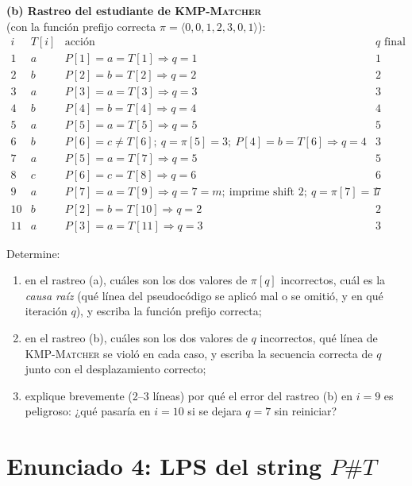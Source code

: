 \documentclass[11pt]{article}
\begin{document}
\textbf{(b) Rastreo del estudiante de \textsc{KMP-Matcher}}\\
(con la función prefijo correcta \(\pi=\langle0,0,1,2,3,0,1\rangle\)):
\[
\begin{array}{c|c|c|c}
i & T[i] & \text{acción} & q \text{ final reportado}\\\hline
1 & a & P[1]{=}a = T[1] \Rightarrow q=1 & 1\\
2 & b & P[2]{=}b = T[2] \Rightarrow q=2 & 2\\
3 & a & P[3]{=}a = T[3] \Rightarrow q=3 & 3\\
4 & b & P[4]{=}b = T[4] \Rightarrow q=4 & 4\\
5 & a & P[5]{=}a = T[5] \Rightarrow q=5 & 5\\
6 & b & P[6]{=}c \neq T[6];\ q=\pi[5]=3;\ P[4]{=}b = T[6] \Rightarrow q=4 & 3\\
7 & a & P[5]{=}a = T[7] \Rightarrow q=5 & 5\\
8 & c & P[6]{=}c = T[8] \Rightarrow q=6 & 6\\
9 & a & P[7]{=}a = T[9] \Rightarrow q=7=m;\ \text{imprime shift } 2;\ q=\pi[7]=1 & 7\\
10 & b & P[2]{=}b = T[10] \Rightarrow q=2 & 2\\
11 & a & P[3]{=}a = T[11] \Rightarrow q=3 & 3
\end{array}
\]

Determine:
\begin{enumerate}[label=(\alph*),itemsep=0.25em]
  \item en el rastreo (a), cuáles son los dos valores de \(\pi[q]\) incorrectos, cuál es la \emph{causa raíz} (qué línea del pseudocódigo se aplicó mal o se omitió, y en qué iteración \(q\)), y escriba la función prefijo correcta;
  \item en el rastreo (b), cuáles son los dos valores de \(q\) incorrectos, qué línea de \textsc{KMP-Matcher} se violó en cada caso, y escriba la secuencia correcta de \(q\) junto con el desplazamiento correcto;
  \item explique brevemente (2--3 líneas) por qué el error del rastreo (b) en \(i=9\) es peligroso: ¿qué pasaría en \(i=10\) si se dejara \(q=7\) sin reiniciar?
\end{enumerate}

\clearpage

\section*{Enunciado 4: LPS del string $P\#T$}
\end{document}
